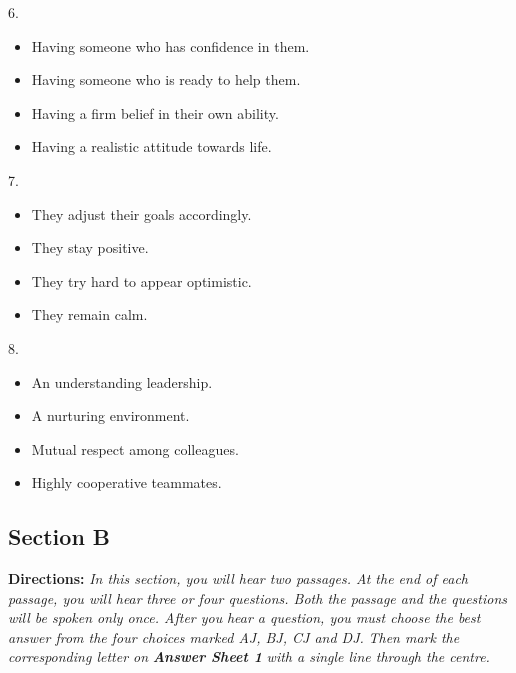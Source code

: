 \documentclass[UTF8,11pt]{ctexart}
\begin{document}
6.


\begin{itemize}[leftmargin=2em,itemsep=.2em,topsep=.4em]\item[A.] Having someone who has confidence in them.
\item[B.] Having someone who is ready to help them.
\item[C.] Having a firm belief in their own ability.
\item[D.] Having a realistic attitude towards life.
\end{itemize}

7.


\begin{itemize}[leftmargin=2em,itemsep=.2em,topsep=.4em]\item[A.] They adjust their goals accordingly.
\item[C.] They stay positive.
\end{itemize}

\begin{itemize}[leftmargin=2em,itemsep=.2em,topsep=.4em]\item[B.] They try hard to appear optimistic.
\item[D.] They remain calm.
\end{itemize}

8.


\begin{itemize}[leftmargin=2em,itemsep=.2em,topsep=.4em]\item[A.] An understanding leadership.
\item[B.] A nurturing environment.
\item[C.] Mutual respect among colleagues.
\item[D.] Highly cooperative teammates.
\end{itemize}

\subsection*{\textbf{Section B}}


\textbf{Directions: }\textit{In this section, you will hear two passages. At the end of each passage, you will hear} \textit{three or four questions. Both the passage and the questions will be spoken only once. After you} \textit{hear a question, you must choose the best answer from the four choices marked AJ, BJ, CJ and DJ.} \textit{Then mark the corresponding letter on }\textbf{\textit{Answer Sheet 1 }}\textit{with a single line through the centre.}
\end{document}
